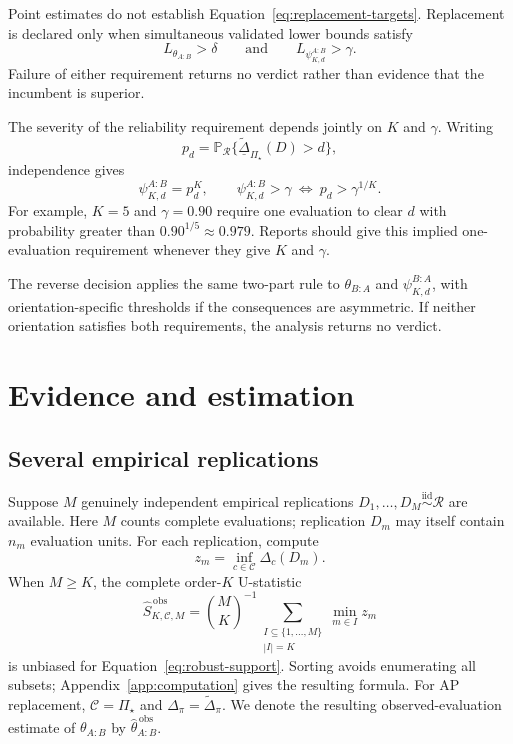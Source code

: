 \documentclass[11pt]{article}
\newcommand{\Regime}{\mathcal{R}}
\newcommand{\CSet}{\mathcal{C}}
\newcommand{\PSet}{\Pi_\star}
\newcommand{\Prb}{\mathbb{P}}
\newcommand{\iid}{\mathrel{\overset{\mathrm{iid}}{\sim}}}
\newcommand{\Dta}{\widetilde{\Delta}}
\newcommand{\RobDta}{\underline{\widetilde{\Delta}}_{\PSet}}
\theoremstyle{remark}
\begin{document}
Point estimates do not establish Equation~\eqref{eq:replacement-targets}. Replacement is declared only when simultaneous validated lower bounds satisfy
\begin{equation}
L_{\theta_{A:B}}>\delta
\qquad\text{and}\qquad
L_{\psi^{A:B}_{K,d}}>\gamma.
\label{eq:replacement}
\end{equation}
Failure of either requirement returns no verdict rather than evidence that the incumbent is superior.

The severity of the reliability requirement depends jointly on $K$ and $\gamma$. Writing
\[
p_d=\Prb_{\Regime}\{\RobDta(D)>d\},
\]
independence gives
\begin{equation}
\psi^{A:B}_{K,d}=p_d^K,
\qquad
\psi^{A:B}_{K,d}>\gamma
\ \Longleftrightarrow\ 
p_d>\gamma^{1/K}.
\label{eq:implied-one-evaluation}
\end{equation}
For example, $K=5$ and $\gamma=0.90$ require one evaluation to clear $d$ with probability greater than $0.90^{1/5}\approx0.979$. Reports should give this implied one-evaluation requirement whenever they give $K$ and $\gamma$.

The reverse decision applies the same two-part rule to $\theta_{B:A}$ and $\psi^{B:A}_{K,d}$, with orientation-specific thresholds if the consequences are asymmetric. If neither orientation satisfies both requirements, the analysis returns no verdict.

\section{Evidence and estimation}
\label{sec:estimation}

\subsection{Several empirical replications}

Suppose $M$ genuinely independent empirical replications $D_1,\ldots,D_M\iid\Regime$ are available. Here $M$ counts complete evaluations; replication $D_m$ may itself contain $n_m$ evaluation units. For each replication, compute
\[
z_m
=
\inf_{c\in\CSet}\Delta_c(D_m).
\]
When $M\geq K$, the complete order-$K$ U-statistic \cite{hoeffding1948ustat}
\begin{equation}
\widehat S_{K,\CSet,M}^{\,\mathrm{obs}}
=
\binom MK^{-1}
\sum_{\substack{I\subseteq\{1,\ldots,M\}\\|I|=K}}
\min_{m\in I}z_m
\label{eq:observed-u}
\end{equation}
is unbiased for Equation~\eqref{eq:robust-support}. Sorting avoids enumerating all subsets; Appendix~\ref{app:computation} gives the resulting formula. For AP replacement, $\CSet=\PSet$ and $\Delta_\pi=\Dta_\pi$. We denote the resulting observed-evaluation estimate of $\theta_{A:B}$ by $\widehat\theta_{A:B}^{\,\mathrm{obs}}$.
\end{document}
